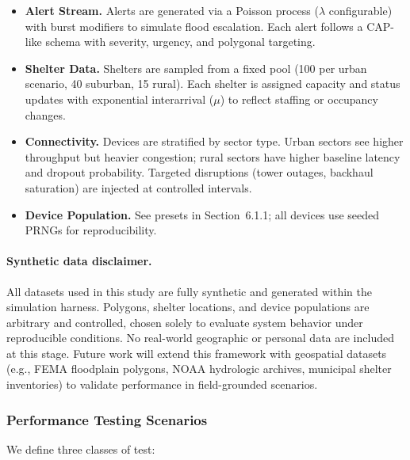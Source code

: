 \documentclass[11pt,twocolumn]{article}
\begin{document}
\begin{itemize}
    \item \textbf{Alert Stream.} Alerts are generated via a Poisson process ($\lambda$ configurable) with burst modifiers to simulate flood escalation. Each alert follows a CAP-like schema with severity, urgency, and polygonal targeting.
    \item \textbf{Shelter Data.} Shelters are sampled from a fixed pool (100 per urban scenario, 40 suburban, 15 rural). Each shelter is assigned capacity and status updates with exponential interarrival ($\mu$) to reflect staffing or occupancy changes.
    \item \textbf{Connectivity.} Devices are stratified by sector type. Urban sectors see higher throughput but heavier congestion; rural sectors have higher baseline latency and dropout probability. Targeted disruptions (tower outages, backhaul saturation) are injected at controlled intervals.
    \item \textbf{Device Population.} See presets in Section~6.1.1; all devices use seeded PRNGs for reproducibility.
\end{itemize}

\paragraph{Synthetic data disclaimer.}
All datasets used in this study are fully synthetic and generated within the simulation harness. Polygons, shelter locations, and device populations are arbitrary and controlled, chosen solely to evaluate system behavior under reproducible conditions. No real-world geographic or personal data are included at this stage. Future work will extend this framework with geospatial datasets (e.g., FEMA floodplain polygons, NOAA hydrologic archives, municipal shelter inventories) to validate performance in field-grounded scenarios.

\subsubsection{Performance Testing Scenarios}

We define three classes of test:
\end{document}
